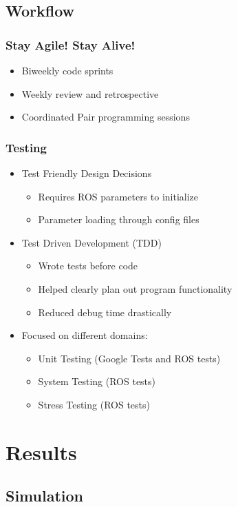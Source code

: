 \documentclass{beamer}
\begin{document}
\subsection{Workflow}
\begin{frame}
\frametitle{Stay Agile! Stay Alive!}
\begin{itemize}
\item Biweekly code sprints
\item Weekly review and retrospective
\item Coordinated Pair programming sessions
\end{itemize}
\end{frame}

\begin{frame}
\frametitle{Testing}
\begin{itemize}
\item Test Friendly Design Decisions
\begin{itemize}
\item Requires ROS parameters to initialize
\item Parameter loading through config files
\end{itemize}
\item Test Driven Development (TDD)
\begin{itemize}
\item Wrote tests before code
\item Helped clearly plan out program functionality
\item Reduced debug time drastically
\end{itemize}
\item Focused on different domains:
\begin{itemize}
\item Unit Testing (Google Tests and ROS tests)
\item System Testing (ROS tests)
\item Stress Testing  (ROS tests)
\end{itemize}
\end{itemize}
\end{frame}

\section{Results}

\subsection{Simulation}
\end{document}
